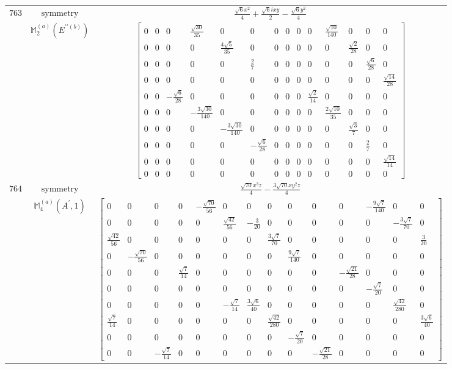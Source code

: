 \documentclass[fleqn,8pt,landscape]{jsarticle}
\begin{document}
\begin{longtable}{ccc}
$ 763 $ & $ \text{symmetry} $ & $ \frac{\sqrt{6} x^{2}}{4} + \frac{\sqrt{6} i x y}{2} - \frac{\sqrt{6} y^{2}}{4} $ \\
$  $ & $ \mathbb{M}_{2}^{(a)}(E^{\prime\prime(b)}) $ & $ \begin{bmatrix} 0 & 0 & 0 & \frac{\sqrt{30}}{35} & 0 & 0 & 0 & 0 & 0 & 0 & \frac{\sqrt{10}}{140} & 0 & 0 & 0 \\ 0 & 0 & 0 & 0 & \frac{4 \sqrt{5}}{35} & 0 & 0 & 0 & 0 & 0 & 0 & \frac{\sqrt{2}}{28} & 0 & 0 \\ 0 & 0 & 0 & 0 & 0 & \frac{2}{7} & 0 & 0 & 0 & 0 & 0 & 0 & \frac{\sqrt{6}}{28} & 0 \\ 0 & 0 & 0 & 0 & 0 & 0 & 0 & 0 & 0 & 0 & 0 & 0 & 0 & \frac{\sqrt{14}}{28} \\ 0 & 0 & - \frac{\sqrt{6}}{28} & 0 & 0 & 0 & 0 & 0 & 0 & \frac{\sqrt{2}}{14} & 0 & 0 & 0 & 0 \\ 0 & 0 & 0 & - \frac{3 \sqrt{30}}{140} & 0 & 0 & 0 & 0 & 0 & 0 & \frac{2 \sqrt{10}}{35} & 0 & 0 & 0 \\ 0 & 0 & 0 & 0 & - \frac{3 \sqrt{30}}{140} & 0 & 0 & 0 & 0 & 0 & 0 & \frac{\sqrt{3}}{7} & 0 & 0 \\ 0 & 0 & 0 & 0 & 0 & - \frac{\sqrt{6}}{28} & 0 & 0 & 0 & 0 & 0 & 0 & \frac{2}{7} & 0 \\ 0 & 0 & 0 & 0 & 0 & 0 & 0 & 0 & 0 & 0 & 0 & 0 & 0 & \frac{\sqrt{14}}{14} \\ 0 & 0 & 0 & 0 & 0 & 0 & 0 & 0 & 0 & 0 & 0 & 0 & 0 & 0 \end{bmatrix} $ \\ \hline
$ 764 $ & $ \text{symmetry} $ & $ \frac{\sqrt{70} x^{3} z}{4} - \frac{3 \sqrt{70} x y^{2} z}{4} $ \\
$  $ & $ \mathbb{M}_{4}^{(a)}(A^{\prime},1) $ & $ \begin{bmatrix} 0 & 0 & 0 & 0 & - \frac{\sqrt{70}}{56} & 0 & 0 & 0 & 0 & 0 & 0 & - \frac{9 \sqrt{7}}{140} & 0 & 0 \\ 0 & 0 & 0 & 0 & 0 & \frac{\sqrt{42}}{56} & - \frac{3}{20} & 0 & 0 & 0 & 0 & 0 & - \frac{3 \sqrt{7}}{70} & 0 \\ \frac{\sqrt{42}}{56} & 0 & 0 & 0 & 0 & 0 & 0 & \frac{3 \sqrt{7}}{70} & 0 & 0 & 0 & 0 & 0 & \frac{3}{20} \\ 0 & - \frac{\sqrt{70}}{56} & 0 & 0 & 0 & 0 & 0 & 0 & \frac{9 \sqrt{7}}{140} & 0 & 0 & 0 & 0 & 0 \\ 0 & 0 & 0 & \frac{\sqrt{7}}{14} & 0 & 0 & 0 & 0 & 0 & 0 & - \frac{\sqrt{21}}{28} & 0 & 0 & 0 \\ 0 & 0 & 0 & 0 & 0 & 0 & 0 & 0 & 0 & 0 & 0 & - \frac{\sqrt{7}}{20} & 0 & 0 \\ 0 & 0 & 0 & 0 & 0 & - \frac{\sqrt{7}}{14} & \frac{3 \sqrt{6}}{40} & 0 & 0 & 0 & 0 & 0 & \frac{\sqrt{42}}{280} & 0 \\ \frac{\sqrt{7}}{14} & 0 & 0 & 0 & 0 & 0 & 0 & \frac{\sqrt{42}}{280} & 0 & 0 & 0 & 0 & 0 & \frac{3 \sqrt{6}}{40} \\ 0 & 0 & 0 & 0 & 0 & 0 & 0 & 0 & - \frac{\sqrt{7}}{20} & 0 & 0 & 0 & 0 & 0 \\ 0 & 0 & - \frac{\sqrt{7}}{14} & 0 & 0 & 0 & 0 & 0 & 0 & - \frac{\sqrt{21}}{28} & 0 & 0 & 0 & 0 \end{bmatrix} $ \\ \hline

\end{longtable}
\end{document}
